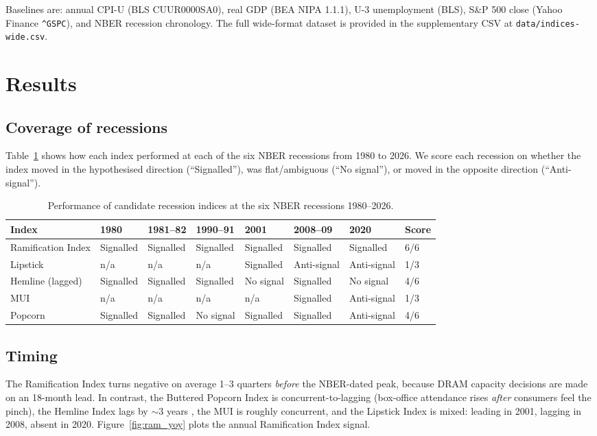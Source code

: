 \documentclass[11pt,a4paper]{article}
\begin{document}
Baselines are: annual CPI-U (BLS CUUR0000SA0), real GDP (BEA NIPA 1.1.1), U-3 unemployment (BLS), S\&P 500 close (Yahoo Finance \verb|^GSPC|), and NBER recession chronology. The full wide-format dataset is provided in the supplementary CSV at \verb|data/indices-wide.csv|.

\section{Results}
\label{sec:results}

\subsection{Coverage of recessions}

Table~\ref{tab:coverage} shows how each index performed at each of the six NBER recessions from 1980 to 2026. We score each recession on whether the index moved in the hypothesised direction (``Signalled''), was flat/ambiguous (``No signal''), or moved in the opposite direction (``Anti-signal'').

\begin{table}[h]
\centering
\caption{Performance of candidate recession indices at the six NBER recessions 1980--2026.}
\label{tab:coverage}
\small
\begin{tabular}{l l l l l l l l}
\toprule
Index & 1980 & 1981--82 & 1990--91 & 2001 & 2008--09 & 2020 & Score \\
\midrule
Ramification Index & Signalled & Signalled & Signalled & Signalled & Signalled & Signalled & 6/6 \\
Lipstick & n/a & n/a & n/a & Signalled & Anti-signal & Anti-signal & 1/3 \\
Hemline (lagged) & Signalled & Signalled & Signalled & No signal & Signalled & No signal & 4/6 \\
MUI & n/a & n/a & n/a & n/a & Signalled & Anti-signal & 1/3 \\
Popcorn & Signalled & Signalled & No signal & Signalled & Signalled & Anti-signal & 4/6 \\
\bottomrule
\end{tabular}
\end{table}

\subsection{Timing}

The Ramification Index turns negative on average 1--3 quarters \emph{before} the NBER-dated peak, because DRAM capacity decisions are made on an 18-month lead. In contrast, the Buttered Popcorn Index is concurrent-to-lagging (box-office attendance rises \emph{after} consumers feel the pinch), the Hemline Index lags by $\sim$3 years \citep{baardwijk2010}, the MUI is roughly concurrent, and the Lipstick Index is mixed: leading in 2001, lagging in 2008, absent in 2020. Figure~\ref{fig:ram_yoy} plots the annual Ramification Index signal.
\end{document}
